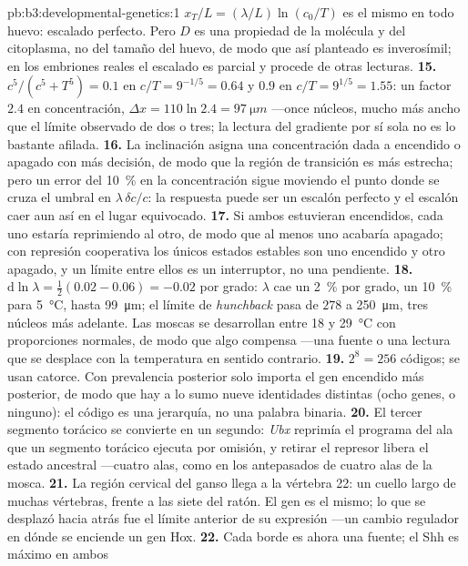 \begin{solution}{pb:b3:developmental-genetics:1}
$x_{T}/L = (\lambda/L)\ln(c_{0}/T)$ es el mismo en todo huevo: escalado
perfecto. Pero $D$ es una propiedad de la molécula y del citoplasma, no
del tamaño del huevo, de modo que así planteado es inverosímil; en los
embriones reales el escalado es parcial y procede de otras lecturas.
\textbf{15.} $c^{5}/(c^{5} + T^{5}) = 0.1$ en $c/T = 9^{-1/5} = 0.64$ y
$0.9$ en $c/T = 9^{1/5} = 1.55$: un factor $2.4$ en concentración,
$\Delta x = 110\ln 2.4 = \qty{97}{\micro m}$ ---once núcleos, mucho más
ancho que el límite observado de dos o tres; la lectura del gradiente
por sí sola no es lo bastante afilada.
\textbf{16.} La inclinación asigna una concentración dada a encendido o
apagado con más decisión, de modo que la región de transición es más
estrecha; pero un error del \qty{10}{\%} en la concentración sigue
moviendo el punto donde se cruza el umbral en $\lambda\,\delta c/c$: la
respuesta puede ser un escalón perfecto y el escalón caer aun así en el
lugar equivocado.
\textbf{17.} Si ambos estuvieran encendidos, cada uno estaría
reprimiendo al otro, de modo que al menos uno acabaría apagado; con
represión cooperativa los únicos estados estables son uno encendido y
otro apagado, y un límite entre ellos es un interruptor, no una
pendiente.
\textbf{18.} $\mathrm{d}\ln\lambda = \tfrac{1}{2}(0.02 - 0.06) = -0.02$
por grado: $\lambda$ cae un \qty{2}{\%} por grado, un \qty{10}{\%} para
\qty{5}{\celsius}, hasta \qty{99}{\micro m}; el límite de
\emph{hunchback} pasa de $278$ a \qty{250}{\micro m}, tres núcleos más
adelante. Las moscas se desarrollan entre \qty{18}{} y
\qty{29}{\celsius} con proporciones normales, de modo que algo
compensa ---una fuente o una lectura que se desplace con la temperatura
en sentido contrario.
\textbf{19.} $2^{8} = 256$ códigos; se usan catorce. Con prevalencia
posterior solo importa el gen encendido más posterior, de modo que hay
a lo sumo nueve identidades distintas (ocho genes, o ninguno): el
código es una jerarquía, no una palabra binaria.
\textbf{20.} El tercer segmento torácico se convierte en un segundo:
\emph{Ubx} reprimía el programa del ala que un segmento torácico
ejecuta por omisión, y retirar el represor libera el estado ancestral
---cuatro alas, como en los antepasados de cuatro alas de la mosca.
\textbf{21.} La región cervical del ganso llega a la vértebra 22: un
cuello largo de muchas vértebras, frente a las siete del ratón. El gen
es el mismo; lo que se desplazó hacia atrás fue el límite anterior de
su expresión ---un cambio regulador en dónde se enciende un gen Hox.
\textbf{22.} Cada borde es ahora una fuente; el Shh es máximo en ambos

\end{solution}
